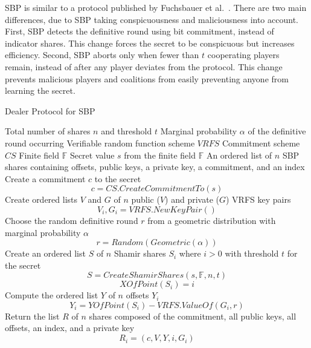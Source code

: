 \documentclass[12pt]{dalcsthesis}
\begin{document}
SBP is similar to a protocol published by Fuchsbauer et al.~\cite{fuch10}. There are two main differences, due to SBP taking conspicuousness and maliciousness into account. First, SBP detects the definitive round using bit commitment, instead of indicator shares. This change forces the secret to be conspicuous but increases efficiency. Second, SBP aborts only when fewer than $t$ cooperating players remain, instead of after any player deviates from the protocol. This change prevents malicious players and coalitions from easily preventing anyone from learning the secret.

\begin{algorithm}
  \caption{Dealer Protocol for SBP}
  \label{alg:SBP:Dealer}
  \begin{algorithmic}
    \INPUT Total number of shares $n$ and threshold $t$
    \INPUT Marginal probability $\alpha$ of the definitive round occurring
    \INPUT Verifiable random function scheme $VRFS$
    \INPUT Commitment scheme $CS$
    \INPUT Finite field $\mathbb{F}$
    \INPUT Secret value $s$ from the finite field $\mathbb{F}$
    \OUTPUT An ordered list of $n$ SBP shares containing offsets, public keys, a private key, a commitment, and an index
    \STATE Create a commitment $c$ to the secret
    	$$c = CS.CreateCommitmentTo(s)$$
    \STATE Create ordered lists $V$ and $G$ of $n$ public ($V$) and private ($G$) VRFS key pairs
    	$$V_i, G_i = VRFS.NewKeyPair()$$
    \STATE Choose the random definitive round $r$ from a geometric distribution with marginal probability $\alpha$
    	$$r = Random(Geometric(\alpha))$$
    \STATE Create an ordered list $S$ of $n$ Shamir shares $S_i$ where $i > 0$ with threshold $t$ for the secret
    	$$S = CreateShamirShares(s, \mathbb{F}, n, t)$$
    	$$XOfPoint(S_i) = i$$
    \STATE Compute the ordered list $Y$ of $n$ offsets $Y_i$
    	$$Y_i = YOfPoint(S_i) - VRFS.ValueOf(G_i, r)$$
    \STATE Return the list $R$ of $n$ shares composed of the commitment, all public keys, all offsets, an index, and a private key
    	$$R_i = (c, V, Y, i, G_i)$$
  \end{algorithmic}
\end{algorithm}
\end{document}

